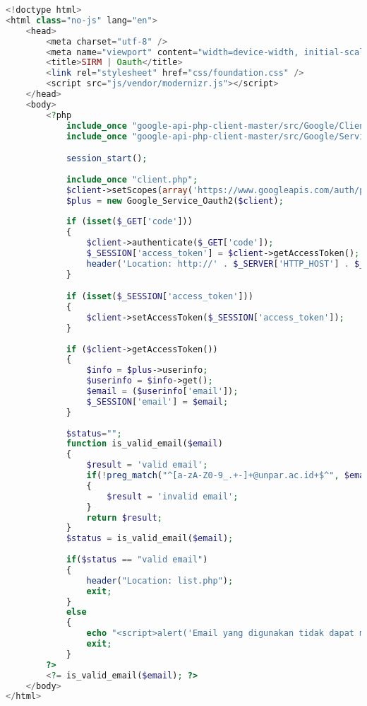 \begin{lstlisting}[language=php,basicstyle=\tiny,caption=oauth.php]
<!doctype html>
<html class="no-js" lang="en">
	<head>
		<meta charset="utf-8" />
		<meta name="viewport" content="width=device-width, initial-scale=1.0" />
		<title>SIRM | Oauth</title>
		<link rel="stylesheet" href="css/foundation.css" />
		<script src="js/vendor/modernizr.js"></script>
	</head>
	<body>
		<?php
			include_once "google-api-php-client-master/src/Google/Client.php";
			include_once "google-api-php-client-master/src/Google/Service/Oauth2.php";

			session_start();
			
			include_once "client.php";
			$client->setScopes(array('https://www.googleapis.com/auth/plus.login','email'));
			$plus = new Google_Service_Oauth2($client);
			
			if (isset($_GET['code']))
			{
				$client->authenticate($_GET['code']);
				$_SESSION['access_token'] = $client->getAccessToken();
				header('Location: http://' . $_SERVER['HTTP_HOST'] . $_SERVER['PHP_SELF']);
			}

			if (isset($_SESSION['access_token']))
			{
				$client->setAccessToken($_SESSION['access_token']);
			}
			
			if ($client->getAccessToken()) 
			{
				$info = $plus->userinfo;
				$userinfo = $info->get();
				$email = ($userinfo['email']);
				$_SESSION['email'] = $email;
			}
			
			$status="";
			function is_valid_email($email)
			{
				$result = 'valid email';
				if(!preg_match("^[a-zA-Z0-9_.+-]+@unpar.ac.id+$^", $email))
				{
					$result = 'invalid email';
				}
				return $result;
			}
			$status = is_valid_email($email);
			
			if($status == "valid email")
			{
				header("Location: list.php");
				exit;
			}
			else
			{
				echo "<script>alert('Email yang digunakan tidak dapat mengakses SIRM. Email yang dapat digunakan untuk mengakses SIRM adalah email yang diakhiri @unpar.ac.id atau @student.unpar.ac.id.');window.location.href='index.php?logout';</script>";
				exit;
			}
		?>
		<?= is_valid_email($email); ?>
	</body>
</html>
\end{lstlisting}

